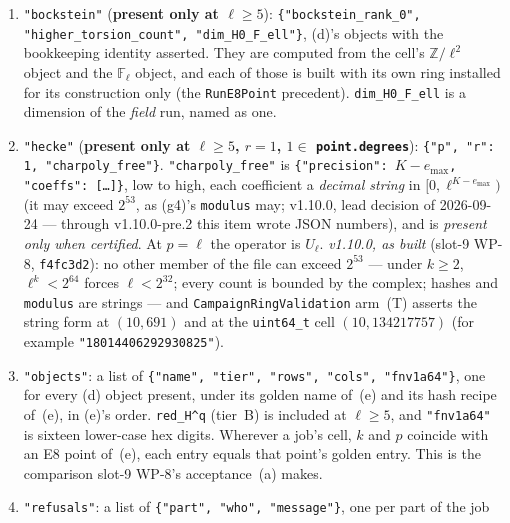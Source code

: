 \documentclass[11pt]{article}
\theoremstyle{remark}
\newcommand{\F}{\mathbb{F}}
\newcommand{\Z}{\mathbb{Z}}
\newcommand{\Fl}{\F_\ell}
\begin{document}
\begin{enumerate}[label=(g\arabic*)]
  \texttt{\{"q", "free\_rank", "torsion"\}} for $q=0,1,2$) \emph{only} when certified. It carries
  \texttt{"state"}, the R3 state of kind \texttt{ladic\_level} of~(d) (budget $\{K\}$, reached
  $\{r_K(d^0),r_K(d^1)\}$, \texttt{complete = false}), \emph{only} when uncertified. The state's
  continuation is a fresh job at a larger $k$, never \texttt{resume}. \emph{v1.10.0, as built}:
  the state also carries \texttt{need: \{r\_K0, r\_K1\}} (deviation~(ii) above).
\item \texttt{"bockstein"} (\textbf{present only at $\ell\ge5$}):
  \texttt{\{"bockstein\_rank\_0", "higher\_torsion\_count", "dim\_H0\_F\_ell"\}}, (d)'s objects
  with the bookkeeping identity asserted. They are computed from the cell's $\Z/\ell^2$ object and
  the $\Fl$ object, and each of those is built with its own ring installed for its construction
  only (the \texttt{RunE8Point} precedent). \texttt{dim\_H0\_F\_ell} is a dimension of the
  \emph{field} run, named as one.
\item \texttt{"hecke"} (\textbf{present only at $\ell\ge5$, $r=1$, $1\in$
  \texttt{point.degrees}}): \texttt{\{"p", "r": 1, "charpoly\_free"\}}.
  \texttt{"charpoly\_free"} is \texttt{\{"precision": $K-e_{\max}$, "coeffs": [\ldots]\}}, low to
  high, each coefficient a \emph{decimal string} in $[0,\ell^{K-e_{\max}})$ (it may exceed
  $2^{53}$, as (g4)'s \texttt{modulus} may; v1.10.0, lead decision of 2026-09-24 --- through
  v1.10.0-pre.2 this item wrote JSON numbers), and is \emph{present only when certified}. At
  $p=\ell$ the operator is $U_\ell$. \emph{v1.10.0, as built} (slot-9 WP-8, \texttt{f4fc3d2}): no
  other member of the file can exceed $2^{53}$ --- under $k\ge2$, $\ell^k<2^{64}$ forces
  $\ell<2^{32}$; every count is bounded by the complex; hashes and \texttt{modulus} are strings ---
  and \texttt{CampaignRingValidation} arm~(T) asserts the string form at $(10,691)$ and at the
  \texttt{uint64\_t} cell $(10,134217757)$ (for example
  \texttt{"18014406292930825"}).
\item \texttt{"objects"}: a list of \texttt{\{"name", "tier", "rows", "cols", "fnv1a64"\}}, one
  for every (d) object present, under its golden name of~(e) and its hash recipe of~(e), in (e)'s
  order. \texttt{red\_H\textasciicircum q} (tier~B) is included at $\ell\ge5$, and
  \texttt{"fnv1a64"} is sixteen lower-case hex digits. Wherever a job's cell, $k$ and $p$ coincide
  with an E8 point of~(e), each entry equals that point's golden entry. This is the comparison
  slot-9 WP-8's acceptance~(a) makes.
\item \texttt{"refusals"}: a list of \texttt{\{"part", "who", "message"\}}, one per part of the job

\end{enumerate}
\end{document}

